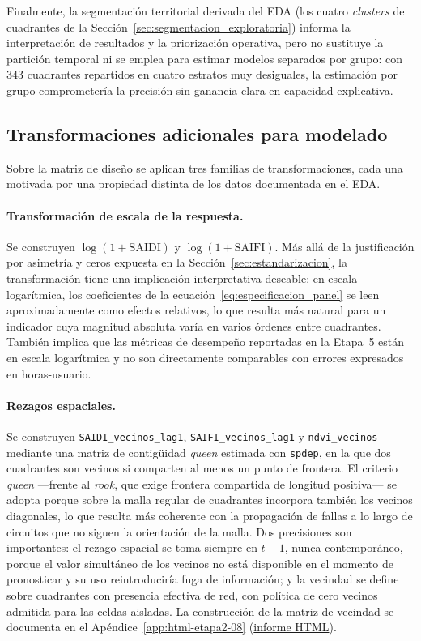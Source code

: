 Finalmente, la segmentación territorial derivada del EDA (los cuatro \emph{clusters} de cuadrantes de la Sección~\ref{sec:segmentacion_exploratoria}) informa la interpretación de resultados y la priorización operativa, pero no sustituye la partición temporal ni se emplea para estimar modelos separados por grupo: con $343$ cuadrantes repartidos en cuatro estratos muy desiguales, la estimación por grupo comprometería la precisión sin ganancia clara en capacidad explicativa.

\subsection{Transformaciones adicionales para modelado}
\label{sec:transformaciones_modelado}
Sobre la matriz de diseño se aplican tres familias de transformaciones, cada una motivada por una propiedad distinta de los datos documentada en el EDA.

\paragraph{Transformación de escala de la respuesta.} Se construyen $\log(1+\mathrm{SAIDI})$ y $\log(1+\mathrm{SAIFI})$. Más allá de la justificación por asimetría y ceros expuesta en la Sección~\ref{sec:estandarizacion}, la transformación tiene una implicación interpretativa deseable: en escala logarítmica, los coeficientes de la ecuación~\eqref{eq:especificacion_panel} se leen aproximadamente como efectos relativos, lo que resulta más natural para un indicador cuya magnitud absoluta varía en varios órdenes entre cuadrantes. También implica que las métricas de desempeño reportadas en la Etapa~5 están en escala logarítmica y no son directamente comparables con errores expresados en horas-usuario.

\paragraph{Rezagos espaciales.} Se construyen \texttt{SAIDI\_vecinos\_lag1}, \texttt{SAIFI\_vecinos\_lag1} y \texttt{ndvi\_vecinos} mediante una matriz de contigüidad \emph{queen} estimada con \texttt{spdep}, en la que dos cuadrantes son vecinos si comparten al menos un punto de frontera. El criterio \emph{queen} —frente al \emph{rook}, que exige frontera compartida de longitud positiva— se adopta porque sobre la malla regular de cuadrantes incorpora también los vecinos diagonales, lo que resulta más coherente con la propagación de fallas a lo largo de circuitos que no siguen la orientación de la malla. Dos precisiones son importantes: el rezago espacial se toma siempre en $t-1$, nunca contemporáneo, porque el valor simultáneo de los vecinos no está disponible en el momento de pronosticar y su uso reintroduciría fuga de información; y la vecindad se define sobre cuadrantes con presencia efectiva de red, con política de cero vecinos admitida para las celdas aisladas. La construcción de la matriz de vecindad se documenta en el Apéndice~\ref{app:html-etapa2-08} (\href{\urlEtapaDosOcho}{informe HTML}).

